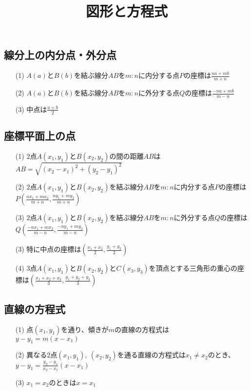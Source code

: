 \documentclass[twocolumn, 20pt]{jarticle}
\title{図形と方程式}
\begin{document}
\columnseprule=0.2mm
\date{}
\maketitle
\subsection*{線分上の内分点・外分点}
\begin{itemize}
  \item[(1)]$A(a)$と$B(b)$を結ぶ線分$AB$を$m:n$に内分する点$P$の座標は{\Large{$\displaystyle \frac{na+mb}{m+n}$}}
  \item[(2)] $A(a)$と$B(b)$を結ぶ線分$AB$を$m:n$に外分する点$Q$の座標は{\Large{$\displaystyle \frac{-na+mb}{m-n}$}}
  \item[(3)]中点は{\Large{$\displaystyle \frac{a+b}{2}$}}
\end{itemize}
\subsection*{座標平面上の点}
\begin{itemize}
  \item[(1)]$2$点$A(x_1, y_1)$と$B(x_2, y_2)$の間の距離$AB$は\\ {\Large{$\displaystyle AB = \sqrt{(x_2 - x_1)^2 + (y_2 - y_1)^2}$}}
  \item[(2)] $2$点$A(x_1, y_1)$と$B(x_2, y_2)$を結ぶ線分$AB$を$m:n$に内分する点$P$の座標は{\Large{$\displaystyle P(\frac{nx_1 + mx_2}{m+n},\frac{ny_1 + my_2}{m+n})$}}
  \item[(3)]$2$点$A(x_1, y_1)$と$B(x_2, y_2)$を結ぶ線分$AB$を$m:n$に外分する点$Q$の座標は{\Large{$\displaystyle Q(\frac{-nx_1 + mx_2}{m-n},\frac{-ny_1 + my_2}{m-n})$}}
  \item[(3)]特に中点の座標は{\Large{$\displaystyle (\frac{x_1 + x_2}{2},\frac{y_1 + y_2}{2})$}}
  \item[(4)]$3$点$A(x_1, y_1)$と$B(x_2, y_2)$と$C(x_3 , y_3)$を頂点とする三角形の重心の座標は{\Large{$\displaystyle (\frac{x_1 + x_2 + x_3}{3}, \frac{y_1 + y_2 + y_3}{3})$}}
\end{itemize}
\newpage
\subsection*{直線の方程式}
\begin{itemize}
  \item[(1)]点$(x_1,y_1)$を通り、傾きが$m$の直線の方程式は\\{\Large{$y - y_1 = m(x-x_1)$}}
  \item[(2)]異なる2点$(x_1, y_1),\ (x_2, y_2)$を通る直線の方程式は$x_1 \neq x_2$のとき、{\Large{$\displaystyle y - y_1 = \frac{y_2 - y_1}{x_2 - x_1}(x - x_1)$}}
  \item[(3)] $x_1 = x_2$のときは{\Large{$x=x_1$}}
\end{itemize}
\end{document}
